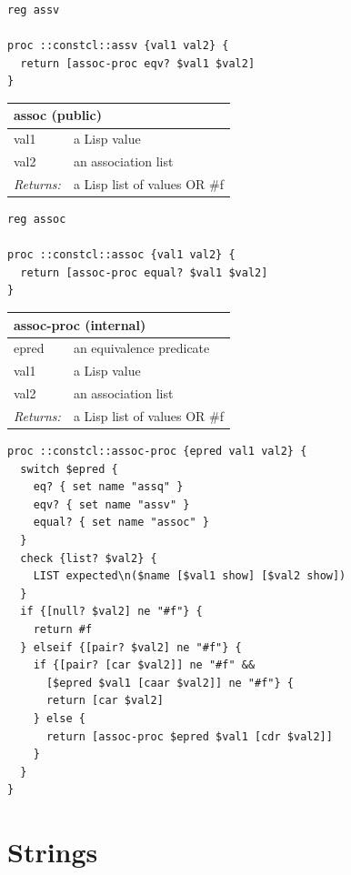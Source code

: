 \documentclass[twoside,9pt]{report}
\begin{document}
\noindent\makebox[\linewidth]{\rule{\linewidth}{0.4pt}}
\begin{lstlisting}
reg assv
 
proc ::constcl::assv {val1 val2} {
  return [assoc-proc eqv? $val1 $val2]
}
\end{lstlisting}
\noindent\makebox[\linewidth]{\rule{\linewidth}{0.4pt}}
\begin{tabular}{ |l l| }
\hline
\multicolumn{2}{|l|}{assoc (public)} \\
\hline
val1 & a Lisp value \\
val2 & an association list \\
\textit{Returns:} & a Lisp list of values OR \#f \\
\hline
\end{tabular}

\noindent\makebox[\linewidth]{\rule{\linewidth}{0.4pt}}
\begin{lstlisting}
reg assoc
 
proc ::constcl::assoc {val1 val2} {
  return [assoc-proc equal? $val1 $val2]
}
\end{lstlisting}
\noindent\makebox[\linewidth]{\rule{\linewidth}{0.4pt}}
\begin{tabular}{ |l l| }
\hline
\multicolumn{2}{|l|}{assoc-proc (internal)} \\
\hline
epred & an equivalence predicate \\
val1 & a Lisp value \\
val2 & an association list \\
\textit{Returns:} & a Lisp list of values OR \#f \\
\hline
\end{tabular}

\noindent\makebox[\linewidth]{\rule{\linewidth}{0.4pt}}
\begin{lstlisting}
proc ::constcl::assoc-proc {epred val1 val2} {
  switch $epred {
    eq? { set name "assq" }
    eqv? { set name "assv" }
    equal? { set name "assoc" }
  }
  check {list? $val2} {
    LIST expected\n($name [$val1 show] [$val2 show])
  }
  if {[null? $val2] ne "#f"} {
    return #f
  } elseif {[pair? $val2] ne "#f"} {
    if {[pair? [car $val2]] ne "#f" && 
      [$epred $val1 [caar $val2]] ne "#f"} {
      return [car $val2]
    } else {
      return [assoc-proc $epred $val1 [cdr $val2]]
    }
  }
}
\end{lstlisting}
\noindent\makebox[\linewidth]{\rule{\linewidth}{0.4pt}}
\section{Strings}
\label{strings}
\end{document}
